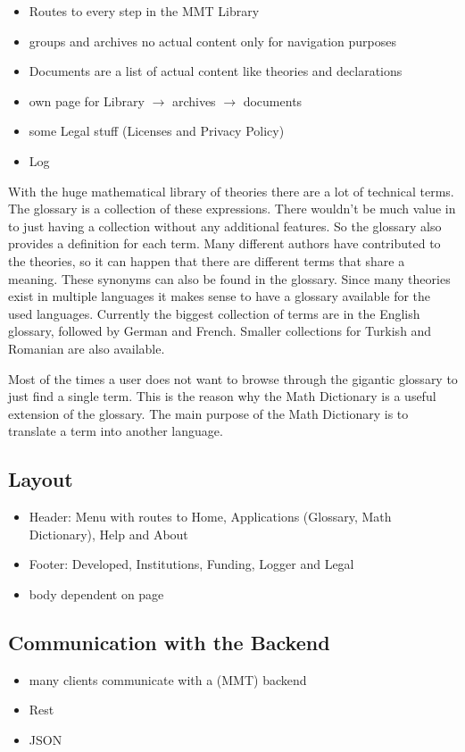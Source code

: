 \documentclass[11pt,a4paper]{article}
\begin{document}
\begin{itemize}
\item Routes to every step in the MMT Library
\item groups and archives no actual content only for navigation purposes
\item Documents are a list of actual content like theories and declarations
\item own page for Library $\rightarrow$ archives $\rightarrow$ documents
\item some Legal stuff (Licenses and Privacy Policy)
\item Log
\end{itemize}
With the huge mathematical library of theories there are a lot of technical terms. The glossary is a collection of these expressions. There wouldn't be much value in to just having a collection without any additional features. So the glossary also provides a definition for each term. Many different authors have contributed to the theories, so it can happen that there are different terms that share a meaning. These synonyms can also be found in the glossary. Since many theories exist in multiple languages it makes sense to have a glossary available for the used languages. Currently the biggest collection of terms are in the English glossary, followed by German and French. Smaller collections for Turkish and Romanian are also available.


Most of the times a user does not want to browse through the gigantic glossary to just find a single term. This is the reason why the Math Dictionary is a useful extension of the glossary.
The main purpose of the Math Dictionary is to translate a term into another language.

\subsection{Layout}
\begin{itemize}
\item Header: Menu with routes to Home, Applications (Glossary, Math Dictionary), Help and About
\item Footer: Developed, Institutions, Funding, Logger and Legal 
\item body dependent on page
\end{itemize}

\subsection{Communication with the Backend}
\begin{itemize}
\item many clients communicate with a (MMT) backend
\item Rest
\item JSON
\end{itemize}
\end{document}
